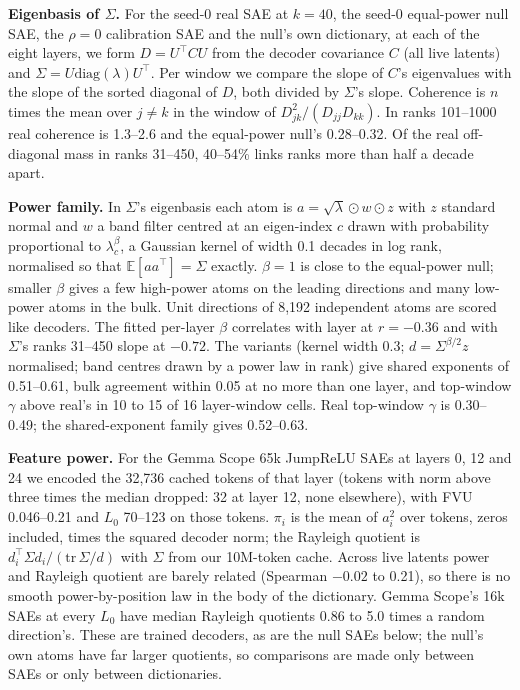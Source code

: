 \documentclass{article}
\newcommand{\Sig}{\Sigma}
\newcommand{\Lz}{L_0}
\begin{document}
\textbf{Eigenbasis of $\Sig$.} For the seed-0 real SAE at $k=40$, the seed-0 equal-power null SAE, the $\rho=0$ calibration SAE and the null's own dictionary, at each of the eight layers, we form $D=U^\top C U$ from the decoder covariance $C$ (all live latents) and $\Sig = U \mathrm{diag}(\lambda) U^\top$. Per window we compare the slope of $C$'s eigenvalues with the slope of the sorted diagonal of $D$, both divided by $\Sig$'s slope. Coherence is $n$ times the mean over $j \ne k$ in the window of $D_{jk}^2/(D_{jj}D_{kk})$. In ranks 101--1000 real coherence is 1.3--2.6 and the equal-power null's 0.28--0.32. Of the real off-diagonal mass in ranks 31--450, 40--54\% links ranks more than half a decade apart.

\textbf{Power family.} In $\Sig$'s eigenbasis each atom is $a = \sqrt{\lambda} \odot w \odot z$ with $z$ standard normal and $w$ a band filter centred at an eigen-index $c$ drawn with probability proportional to $\lambda_c^{\beta}$, a Gaussian kernel of width 0.1 decades in log rank, normalised so that $\mathbb{E}[aa^\top]=\Sig$ exactly. $\beta=1$ is close to the equal-power null; smaller $\beta$ gives a few high-power atoms on the leading directions and many low-power atoms in the bulk. Unit directions of 8,192 independent atoms are scored like decoders. The fitted per-layer $\beta$ correlates with layer at $r=-0.36$ and with $\Sig$'s ranks 31--450 slope at $-0.72$. The variants (kernel width 0.3; $d=\Sig^{\beta/2}z$ normalised; band centres drawn by a power law in rank) give shared exponents of 0.51--0.61, bulk agreement within 0.05 at no more than one layer, and top-window $\gamma$ above real's in 10 to 15 of 16 layer-window cells. Real top-window $\gamma$ is 0.30--0.49; the shared-exponent family gives 0.52--0.63.

\textbf{Feature power.} For the Gemma Scope 65k JumpReLU SAEs at layers 0, 12 and 24 we encoded the 32,736 cached tokens of that layer (tokens with norm above three times the median dropped: 32 at layer 12, none elsewhere), with FVU 0.046--0.21 and $\Lz$ 70--123 on those tokens. $\pi_i$ is the mean of $a_i^2$ over tokens, zeros included, times the squared decoder norm; the Rayleigh quotient is $d_i^\top \Sig d_i / (\mathrm{tr}\,\Sig/d)$ with $\Sig$ from our 10M-token cache. Across live latents power and Rayleigh quotient are barely related (Spearman $-0.02$ to 0.21), so there is no smooth power-by-position law in the body of the dictionary. Gemma Scope's 16k SAEs at every $\Lz$ have median Rayleigh quotients 0.86 to 5.0 times a random direction's. These are trained decoders, as are the null SAEs below; the null's own atoms have far larger quotients, so comparisons are made only between SAEs or only between dictionaries.
\end{document}
